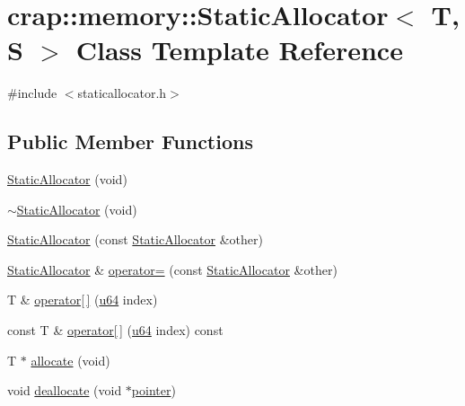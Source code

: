 \hypertarget{classcrap_1_1memory_1_1_static_allocator}{\section{crap\-:\-:memory\-:\-:Static\-Allocator$<$ T, S $>$ Class Template Reference}
\label{classcrap_1_1memory_1_1_static_allocator}
}


{\ttfamily \#include $<$staticallocator.\-h$>$}

\subsection*{Public Member Functions}
\begin{DoxyCompactItemize}
\item 
\hyperlink{classcrap_1_1memory_1_1_static_allocator_a2ab68a34387f5d9afd3a808351dcac83}{Static\-Allocator} (void)
\item 
\hyperlink{classcrap_1_1memory_1_1_static_allocator_af719f2dd154f0bd688bed30ae4c2d364}{$\sim$\-Static\-Allocator} (void)
\item 
\hyperlink{classcrap_1_1memory_1_1_static_allocator_a7e7240ec2fdbcfd2f40b3720ec300ccc}{Static\-Allocator} (const \hyperlink{classcrap_1_1memory_1_1_static_allocator}{Static\-Allocator} \&other)
\item 
\hyperlink{classcrap_1_1memory_1_1_static_allocator}{Static\-Allocator} \& \hyperlink{classcrap_1_1memory_1_1_static_allocator_a68bfc0ac4e357eb5aea39dd134636b3c}{operator=} (const \hyperlink{classcrap_1_1memory_1_1_static_allocator}{Static\-Allocator} \&other)
\item 
T \& \hyperlink{classcrap_1_1memory_1_1_static_allocator_abaecdc0364d8e2a76ded78d1f21b88cc}{operator\mbox{[}$\,$\mbox{]}} (\hyperlink{types_8h_a3f7e2bcbb0b4c338f3c4f6c937cd4234}{u64} index)
\item 
const T \& \hyperlink{classcrap_1_1memory_1_1_static_allocator_a4861a8c2657f77da926888e2d11216bd}{operator\mbox{[}$\,$\mbox{]}} (\hyperlink{types_8h_a3f7e2bcbb0b4c338f3c4f6c937cd4234}{u64} index) const 
\item 
T $\ast$ \hyperlink{classcrap_1_1memory_1_1_static_allocator_adf3ea36bc0d60b60bb050d68ce965e10}{allocate} (void)
\item 
void \hyperlink{classcrap_1_1memory_1_1_static_allocator_abdc564f6fb757e6c34c3f8d5db223050}{deallocate} (void $\ast$\hyperlink{classcrap_1_1memory_1_1_static_allocator_a7b4661b59cdd3bf399603b23c2c71388}{pointer})

\end{DoxyCompactItemize}

